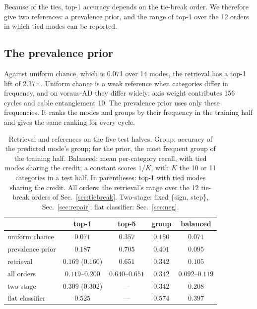 \documentclass{ifacconf}
\begin{document}
Because of the ties, top-1 accuracy depends on the tie-break order. We therefore
give two references: a prevalence prior, and the range of top-1 over the 12
orders in which tied modes can be reported.

\subsection{The prevalence prior}
\label{sec:prior}

Against uniform chance, which is 0.071 over 14 modes, the retrieval has a top-1
lift of 2.37$\times$. Uniform chance is a weak reference when categories
differ in frequency, and on voraus-AD they differ widely: axis weight
contributes 156 cycles and cable entanglement 10. The prevalence prior uses only
these frequencies. It ranks the modes and groups by their frequency in the
training half and gives the same ranking for every cycle.

\begin{table}[t]
\centering
\caption{Retrieval and references on the five test halves. Group: accuracy of
the predicted mode's group; for the prior, the most frequent group of the
training half. Balanced: mean per-category recall, with tied modes sharing the
credit; a constant scores $1/K$, with $K$ the 10 or 11 categories in a test
half. In parentheses: top-1 with tied modes sharing the credit. All orders: the
retrieval's range over the 12 tie-break orders of Sec.~\ref{sec:tiebreak}.
Two-stage: fixed \{sign, step\}, Sec.~\ref{sec:repair}; flat classifier:
Sec.~\ref{sec:neg}.}
\label{tab:baselines}
\small\setlength{\tabcolsep}{3.5pt}
\begin{tabular}{lcccc}
\toprule
& top-1 & top-5 & group & balanced \\
\midrule
uniform chance       & $0.071$ & $0.357$ & $0.150$ & $0.071$ \\
prevalence prior     & $0.187$ & $0.705$ & $0.401$ & $0.095$ \\
retrieval            & $0.169$ ($0.160$) & $0.651$ & $0.342$ & $0.105$ \\
\quad all orders     & $0.119$--$0.200$ & $0.640$--$0.651$ & $0.342$ & $0.092$--$0.119$ \\
\midrule
two-stage            & $0.309$ ($0.302$) & --- & $0.342$ & $0.208$ \\
flat classifier      & $0.525$ & --- & $0.574$ & $0.397$ \\
\bottomrule
\end{tabular}
\end{table}
\end{document}
